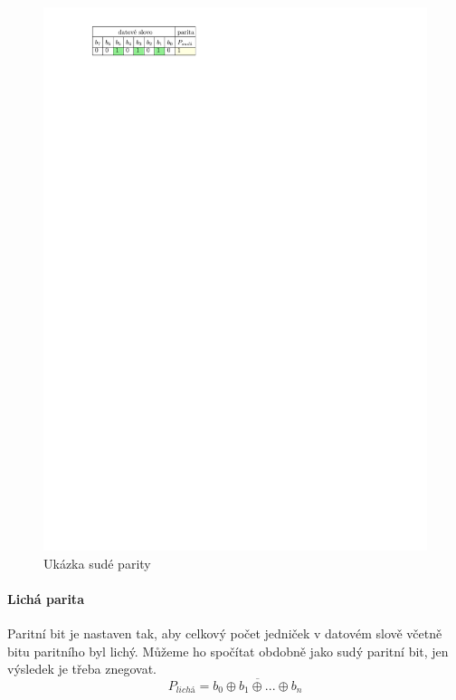 \begin{figure}[H]
    \begin{center}
        \includegraphics[scale=1]{img/parita_suda}
    \end{center}
    \caption{Ukázka sudé parity}
\end{figure}

\paragraph{Lichá parita}
Paritní bit je nastaven tak, aby celkový počet jedniček v datovém slově včetně bitu paritního byl lichý. Můžeme ho spočítat obdobně jako sudý paritní bit, jen výsledek je třeba znegovat.
$$ P_{lichá} = \overline{ b_0 \oplus b_1 \oplus ... \oplus b_n } $$

